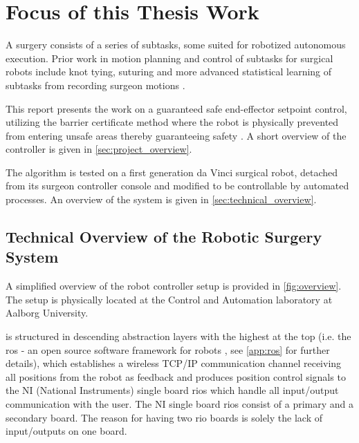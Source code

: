 \section{Focus of this Thesis Work}
A surgery consists of a series of subtasks, some suited for robotized autonomous execution. Prior work in motion planning and control of subtasks for surgical robots include knot tying, suturing and more advanced statistical learning of subtasks from recording surgeon motions \citep{bib:raven_debride,bib:raven_observ}.

This report presents the work on a guaranteed safe end-effector setpoint control, %
utilizing the barrier certificate method where the robot is physically prevented from entering unsafe areas thereby guaranteeing safety \citep{bib:safety}. A short overview of the controller is given in \autoref{sec:project_overview}.

The algorithm is tested on a first generation da Vinci surgical robot, detached from its surgeon controller console and modified to be controllable by automated processes. An overview of the system is given in \autoref{sec:technical_overview}.





\subsection{Technical Overview of the Robotic Surgery System}\label{sec:technical_overview}
A simplified overview of the robot controller setup is provided in \autoref{fig:overview}. The setup is physically located at the Control and Automation laboratory at Aalborg University. 

 is structured in descending abstraction layers with the highest at the top (i.e. the \gls{ros} - an open source software framework for robots \citep{bib:ros}, see \autoref{app:ros} for further details), which establishes a wireless TCP/IP communication channel receiving all positions from the robot as feedback and produces position control signals to the NI (National Instruments) single board \glspl{rio} which handle all input/output communication with the user. The NI single board \glspl{rio} consist of a primary and a secondary board. The reason for having two \gls{rio} boards is solely the lack of input/outputs on one board.

